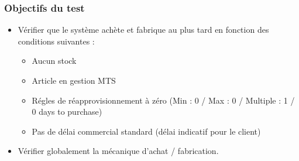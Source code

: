 \documentclass[letterpaper,10pt,french]{sphinxmanual}
\begin{document}
\subsubsection{Objectifs du test}
\label{\detokenize{readthedocs/tests/A1_MTS:objectifs-du-test}}\begin{itemize}
\item {} 
Vérifier que le système achète et fabrique au plus tard en fonction des conditions suivantes :
\begin{itemize}
\item {} 
Aucun stock

\item {} 
Article en gestion MTS

\item {} 
Régles de réapprovisionnement à zéro (Min : 0 / Max : 0 / Multiple : 1 / 0 days to purchase)

\item {} 
Pas de délai commercial standard (délai indicatif pour le client)

\end{itemize}

\item {} 
Vérifier globalement la mécanique d’achat / fabrication.

\end{itemize}
\end{document}
